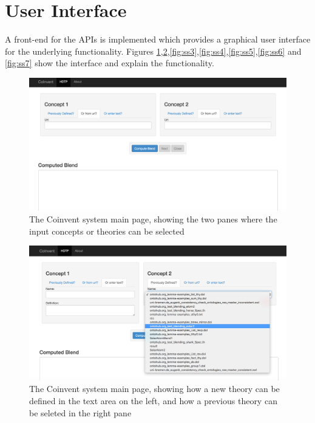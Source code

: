\section{User Interface}

A front-end for the APIs is implemented which provides a graphical user interface for the underlying functionality. Figures \ref{fig:ss1},\ref{fig:ss2},\ref{fig:ss3},\ref{fig:ss4},\ref{fig:ss5},\ref{fig:ss6} and \ref{fig:ss7} show the interface and explain the functionality.

\begin{figure}[!h]
\begin{center}
\includegraphics[width=\textwidth]{ss1.png}
\end{center}
\label{fig:ss1}
\caption{The Coinvent system main page, showing the two panes where the input concepts or theories can be selected}
\end{figure}

\begin{figure}[!h]
\begin{center}
\includegraphics[width=\textwidth]{ss2.png}
\end{center}
\label{fig:ss2}
\caption{The Coinvent system main page, showing how a new theory can be defined in the text area on the left, and how a previous theory can be seleted in the right pane}
\end{figure}

